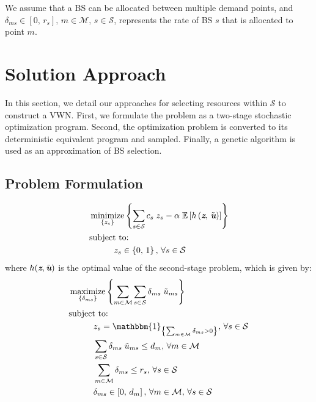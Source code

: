 \documentclass[conference]{IEEEtran}
\newcommand{\ind}[1]{\mathbbm{1}_{\left\{ #1 \right\}}}
\DeclareMathOperator*{\argmin}{minimize}
\DeclareMathOperator*{\argmax}{maximize}
\begin{document}
We assume that a BS can be allocated between multiple demand points, and $\delta_{ms} \in \left[ 0,\, r_s \right],\, m \in \mathcal{M},\, s \in \mathcal{S}$, represents the rate of BS $s$ that is allocated to point $m$.

\section{Solution Approach} \label{sec:approach}

In this section, we detail our approaches for selecting resources within $\mathcal{S}$ to construct a VWN.  First, we formulate the problem as a two-stage stochastic optimization program.  Second, the optimization problem is converted to its deterministic equivalent program and sampled.  Finally, a genetic algorithm is used as an approximation of BS selection.

\subsection{Problem Formulation} \label{subsec:stoch}

\begin{tcolorbox}[floatplacement = !ht, float, title = Problem 1:\\Two-Stage Stochastic Optimization Program]
\begin{align}
& \argmin_{\left\{ z_s \right\}} \left\{ \sum_{s \in \mathcal{S}} c_s \; z_s - \alpha \; \mathbb{E}\left[ h\left( \textit{\textbf{z}},\, \tilde{\textit{\textbf{u}}} \right) \right] \right\} \label{eq:SOPS1O}\\
& \text{subject to:}  \nonumber \\
& \hspace{0.4in} z_s \in \left\{ 0,\, 1 \right\},\, \forall s \in \mathcal{S} \label{eq:SOPS1C1}
\end{align}
where $h(\textit{\textbf{z}}, \tilde{\textit{\textbf{u}}})$ is the optimal value of the second-stage problem, which is given by:
\begin{align}
& \argmax_{\left\{ \delta_{ms} \right\}} \left\{ \sum_{m \in \mathcal{M}} \sum_{s \in \mathcal{S}} \delta_{ms} \; \tilde{u}_{ms} \right\} \label{eq:SOPS2O}\\
& \text{subject to:}  \nonumber \\
& \hspace{0.4in} z_s = \ind{\sum_{m \in \mathcal{M}} \delta_{ms} > 0},\, \forall s \in \mathcal{S} \label{eq:SOPS2C1}\\
& \hspace{0.4in} \sum_{s \in \mathcal{S}} \delta_{ms} \; \tilde{u}_{ms} \leq d_m,\, \forall m \in \mathcal{M} \label{eq:SOPS2C2}\\
& \hspace{0.4in} \sum_{m \in \mathcal{M}} \delta_{ms} \leq r_s,\, \forall s \in \mathcal{S} \label{eq:SOPS2C3}\\
& \hspace{0.4in} \delta_{ms} \in \left[ 0,\, d_m \right],\, \forall m \in \mathcal{M},\, \forall s \in \mathcal{S} \label{eq:SOPS2C4}
\end{align}
\end{tcolorbox}
\end{document}
